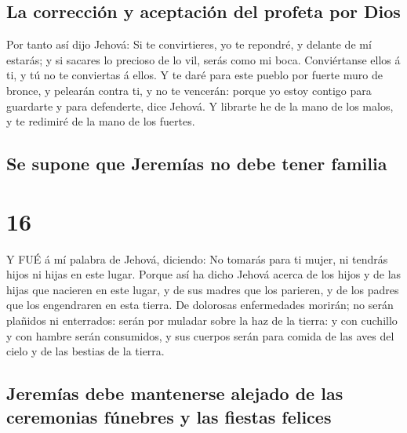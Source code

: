 \hypertarget{la-correcciuxf3n-y-aceptaciuxf3n-del-profeta-por-dios}{%
\subsection{La corrección y aceptación del profeta por
Dios}\label{la-correcciuxf3n-y-aceptaciuxf3n-del-profeta-por-dios}}

 Por tanto así dijo Jehová: Si te convirtieres, yo te
repondré, y delante de mí estarás; y si sacares lo precioso de lo vil,
serás como mi boca. Conviértanse ellos á ti, y tú no te conviertas á
ellos.  Y te daré para este pueblo por fuerte muro de
bronce, y pelearán contra ti, y no te vencerán: porque yo estoy contigo
para guardarte y para defenderte, dice Jehová.  Y librarte
he de la mano de los malos, y te redimiré de la mano de los fuertes.

\hypertarget{se-supone-que-jeremuxedas-no-debe-tener-familia}{%
\subsection{Se supone que Jeremías no debe tener
familia}\label{se-supone-que-jeremuxedas-no-debe-tener-familia}}

\hypertarget{section-15}{%
\section{16}\label{section-15}}

 Y FUÉ á mí palabra de Jehová, diciendo:  No
tomarás para ti mujer, ni tendrás hijos ni hijas en este lugar.
 Porque así ha dicho Jehová acerca de los hijos y de las
hijas que nacieren en este lugar, y de sus madres que los parieren, y de
los padres que los engendraren en esta tierra.  De dolorosas
enfermedades morirán; no serán plañidos ni enterrados: serán por muladar
sobre la haz de la tierra: y con cuchillo y con hambre serán consumidos,
y sus cuerpos serán para comida de las aves del cielo y de las bestias
de la tierra.

\hypertarget{jeremuxedas-debe-mantenerse-alejado-de-las-ceremonias-fuxfanebres-y-las-fiestas-felices}{%
\subsection{Jeremías debe mantenerse alejado de las ceremonias fúnebres
y las fiestas
felices}\label{jeremuxedas-debe-mantenerse-alejado-de-las-ceremonias-fuxfanebres-y-las-fiestas-felices}}

